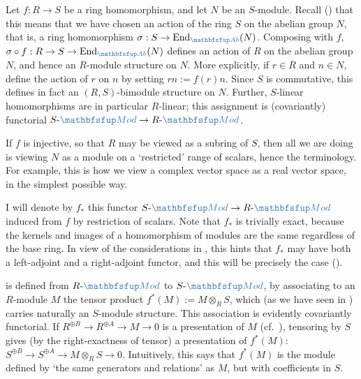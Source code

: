  Let $f : R \to S$ be a ring
homomorphism, and let $N$ be an $S$-module. Recall
() that this means
that we have chosen an action of the ring $S$ on the abelian group
$N$, that is, a ring homomorphism
$\sigma : S \to \mathrm{End}_{\categ{Ab}}(N)$.  Composing with $f$,
$\sigma \circ f : R \to S \to \mathrm{End}_{\categ{Ab}}(N)$ defines an
action of $R$ on the abelian group $N$, and hence an $R$-module
structure on $N$. More explicitly, if $r \in R$ and $n \in N$, define
the action of $r$ on $n$ by setting $rn := f(r)n$.  Since $S$ is
commutative, this defines in fact an $(R,S)$-bimodule structure on
$N$. Further, $S$-linear homomorphisms are in particular $R$-linear;
this assignment is (covariantly) functorial
$S\text{-}\categ{Mod} \to R\text{-}\categ{Mod}$.

If $f$ is injective, so that $R$ may be viewed as a subring of $S$,
then all we are doing is viewing $N$ as a module on a `restricted'
range of scalars, hence the terminology. For example, this is how we
view a complex vector space as a real vector space, in the simplest
possible way.

I will denote by $f_*$ this functor
$S\text{-}\categ{Mod} \to R\text{-}\categ{Mod}$ induced from $f$ by
restriction of scalars. Note that $f_*$ is trivially exact, because
the kernels and images of a homomorphism of modules are the same
regardless of the base ring. In view of the considerations in
,
this hints that $f_*$ may have both a
left-adjoint and a right-adjoint functor, and this will be precisely
the case ().

 is defined from $R\text{-}\categ{Mod}$
to $S\text{-}\categ{Mod}$, by associating to an $R$-module $M$ the
tensor product $f^*(M) := M \otimes_R S$, which (as we have seen in
) carries naturally
an $S$-module structure. This association is evidently covariantly
functorial. If $R^{\oplus B} \to R^{\oplus A} \to M \to 0$ is a
presentation of $M$ (cf.\
),
tensoring by $S$ gives (by the right-exactness of tensor) a
presentation of $f^*(M)$:
$S^{\oplus B} \to S^{\oplus A} \to M \otimes_R S \to 0$.  Intuitively,
this says that $f^*(M)$ is the module defined by `the same generators
and relations' as $M$, but with coefficients in $S$.

